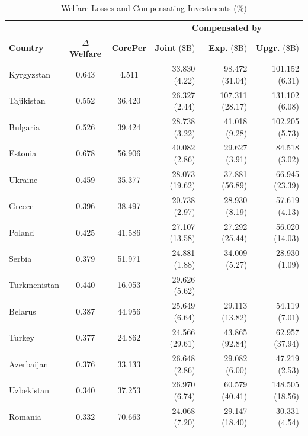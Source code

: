 \documentclass[a4paper]{article}
\begin{document}
\begin{table}[h!]
\centering
\caption{Welfare Losses and Compensating Investments (\%)}
\vspace{2mm}
\label{tab:wloss}
\begin{tabular}{lccrrr} \toprule
 & & & \multicolumn{3}{c}{\textbf{Compensated by}} \\
\textbf{Country} & \textbf{$\Delta$Welfare} & \textbf{CorePer}  & \textbf{Joint} (\$B) & \textbf{Exp.} (\$B) & \textbf{Upgr.} (\$B) \\ \midrule
  Kyrgyzstan & 0.643 & 4.511 & 33.830 (\hphantom{1}4.22) & 98.472 (31.04) & 101.152 (\hphantom{1}6.31) \\ 
  Tajikistan & 0.552 & 36.420 & 26.327 (\hphantom{1}2.44) & 107.311 (28.17) & 131.102 (\hphantom{1}6.08) \\ 
  Bulgaria & 0.526 & 39.424 & 28.738 (\hphantom{1}3.22) & 41.018 (\hphantom{1}9.28) & 102.205 (\hphantom{1}5.73) \\ 
  Estonia & 0.678 & 56.906 & 40.082 (\hphantom{1}2.86) & 29.627 (\hphantom{1}3.91) & 84.518 (\hphantom{1}3.02) \\ 
  Ukraine & 0.459 & 35.377 & 28.073 (19.62) & 37.881 (56.89) & 66.945 (23.39) \\ 
  Greece & 0.396 & 38.497 & 20.738 (\hphantom{1}2.97) & 28.930 (\hphantom{1}8.19) & 57.619 (\hphantom{1}4.13) \\ 
  Poland & 0.425 & 41.586 & 27.107 (13.58) & 27.292 (25.44) & 56.020 (14.03) \\ 
  Serbia & 0.379 & 51.971 & 24.881 (\hphantom{1}1.88) & 34.009 (\hphantom{1}5.27) & 28.930 (\hphantom{1}1.09) \\ 
  Turkmenistan & 0.440 & 16.053 & 29.626 (\hphantom{1}5.62) & &  \\ 
  Belarus & 0.387 & 44.956 & 25.649 (\hphantom{1}6.64) & 29.113 (13.82) & 54.119 (\hphantom{1}7.01) \\ 
  Turkey & 0.377 & 24.862 & 24.566 (29.61) & 43.865 (92.84) & 62.957 (37.94) \\ 
  Azerbaijan & 0.376 & 33.133 & 26.648 (\hphantom{1}2.86) & 29.082 (\hphantom{1}6.00) & 47.219 (\hphantom{1}2.53) \\ 
  Uzbekistan & 0.340 & 37.253 & 26.970 (\hphantom{1}6.74) & 60.579 (40.41) & 148.505 (18.56) \\ 
  Romania & 0.332 & 70.663 & 24.068 (\hphantom{1}7.20) & 29.147 (18.40) & 30.331 (\hphantom{1}4.54) \\ 

\end{tabular}
\end{table}
\end{document}
